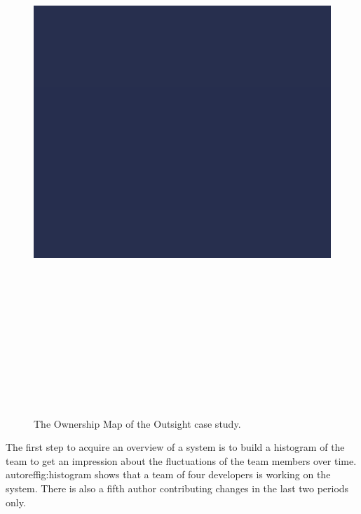 \documentclass[10pt]{book}
\begin{document}
\begin{figure}[htbp]
\begin{center}
\includegraphics[height=21.3cm]{outsight}
\caption{The Ownership Map of the Outsight case study.}
\label{fig:casestudy-outsight}
\end{center}
\end{figure}

The first step to acquire an overview of a system is to build a histogram of the team to get an impression about the fluctuations of the team members over time. autoref{fig:histogram} shows that a team of four developers is working on the system. There is also a fifth author contributing changes in the last two periods only.
\end{document}
